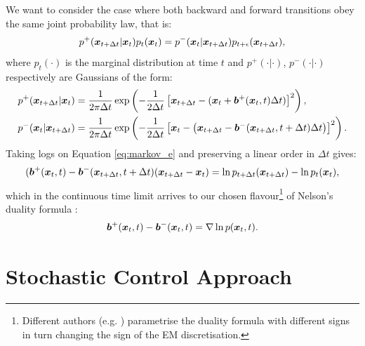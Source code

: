 \documentclass[a4paper,12pt,twoside,openright]{report}
\theoremstyle{definition}
\begin{document}
We want to consider the case where both backward and forward transitions obey the same joint probability law, that is:
\begin{align}\label{eq:markov_e}
    p^{+}({\bm{x}}_{t+\Delta t}|{\bm{x}}_t)p_t({\bm{x}}_t)=p^{-}({\bm{x}}_t|{\bm{x}}_{t+\Delta t})p_{t+\epsilon}({\bm{x}}_{t+\Delta t}),
\end{align}
where $p_t(\cdot)$ is the marginal distribution at time $t$ and $p^{+}(\cdot|\cdot)$,  $p^{-}(\cdot|\cdot)$ respectively are Gaussians of the form:
\begin{align*}
p^{+}({\bm{x}}_{t+\Delta t}|{\bm{x}}_t)&=\frac{1}{2\pi \Delta t }\exp\left(-\frac{1}{2\Delta t}\left[{\bm{x}}_{t+\Delta t}-({\bm{x}}_t+{\bm{b}}^{+}({\bm{x}}_t,t)\Delta t)\right]^2\right), \\
p^{-}({\bm{x}}_t|{\bm{x}}_{t+\Delta t})&=\frac{1}{2\pi \Delta t}\exp\left(-\frac{1}{2\Delta t}\left[{\bm{x}}_t-\left({\bm{x}}_{t+\Delta t}-{\bm{b}}^{-}({\bm{x}}_{t+\Delta t},t+\Delta t)\Delta t\right)\right]^2\right).
\end{align*}
Taking logs on Equation \ref{eq:markov_e} and preserving a linear order in $\Delta t$ gives:
\begin{align*}
    ({\bm{b}}^+({\bm{x}}_t,t)-{\bm{b}}^-({\bm{x}}_{t+\Delta t},t+\Delta t)({\bm{x}}_{t+\Delta t}-{\bm{x}}_t)=\operatorname{ln} p_{t+\Delta t}({\bm{x}}_{t+\Delta t}) - \operatorname{ln} p_t({\bm{x}}_t), 
\end{align*}
which in the continuous time limit arrives to our chosen flavour\footnote{Different authors (e.g. \cite{nagasawa2012stochastic}) parametrise the duality formula with different signs in turn changing the sign of the EM discretisation.} of Nelson's duality formula \citep{nelson1967dynamical}:
\begin{align*}
      {\bm{b}}^+({\bm{x}}_t,t) -{\bm{b}}^-({\bm{x}}_t,t) = \nabla\operatorname{ln} p({\bm{x}}_t, t).
\end{align*}

\section{Stochastic Control Approach}
\end{document}
